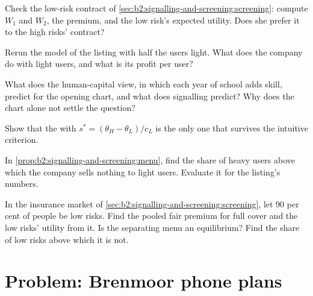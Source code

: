 \begin{exercise}[$\star\star$]\label{exo:b2:signalling-and-screening:7}
Check the low-risk contract of \cref{sec:b2:signalling-and-screening:screening}: compute $W_1$ and $W_2$, the premium, and the low
risk's expected utility. Does she prefer it to the high risks' contract?
\end{exercise}

\begin{exercise}[$\star\star$]\label{exo:b2:signalling-and-screening:8}
Rerun the  model of the listing with half the users light. What does the company do with light users, and what is
its profit per user?
\end{exercise}

\begin{exercise}[$\star\star$]\label{exo:b2:signalling-and-screening:9}
What does the human-capital view, in which each year of school adds skill, predict for the opening chart, and what does
signalling predict? Why does the chart alone not settle the question?
\end{exercise}

\begin{exercise}[$\star\star\star$]\label{exo:b2:signalling-and-screening:10}
Show that the  with $s^* = (\theta_H - \theta_L)/c_L$ is the only one that survives the intuitive criterion.
\end{exercise}

\begin{exercise}[$\star\star\star$]\label{exo:b2:signalling-and-screening:11}
In \cref{prop:b2:signalling-and-screening:menu}, find the share of heavy users above which the company sells nothing to light
users. Evaluate it for the listing's numbers.
\end{exercise}

\begin{exercise}[$\star\star\star$]\label{exo:b2:signalling-and-screening:12}
In the insurance market of \cref{sec:b2:signalling-and-screening:screening}, let 90 per cent of people be low risks. Find the
pooled fair premium for full cover and the low risks' utility from it. Is the separating menu an equilibrium? Find the
share of low risks above which it is not.
\end{exercise}

\section{Problem: Brenmoor phone plans}\label{sec:b2:signalling-and-screening:problem}

